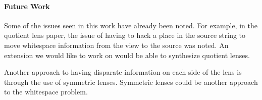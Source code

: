 \documentclass[numbers,10pt,preprint\ifanon ,nocopyrightspace\fi]{sigplanconf}
\begin{document}


\iffull
\paragraph*{Future Work}
Some of the issues seen in this work have already been noted.  For example, in the
quotient lens paper, the issue of having to hack a place in the source string to
move whitespace information from the view to the source was noted.  An extension
we would like to work on would be able to synthesize quotient lenses.

Another approach to having disparate information on each side of the lens is
through the use of symmetric lenses.  Symmetric lenses could be another approach to the
whitespace problem.

\fi


\appendix

\ifanon\else
\acks 
\fi




\end{document}
